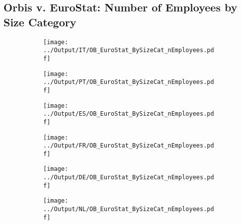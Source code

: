 \documentclass[12pt,notitlepage]{article}
\begin{document}
\subsection{Orbis v. EuroStat: Number of Employees by Size Category}
\begin{figure}[!htpb]
\centering
\begin{subfigure}{.49\textwidth}
    \centering
 \texttt{[image: ../Output/IT/OB\_EuroStat\_BySizeCat\_nEmployees.pdf]}
\end{subfigure}%
\begin{subfigure}{.49\textwidth}
    \centering
 \texttt{[image: ../Output/PT/OB\_EuroStat\_BySizeCat\_nEmployees.pdf]}
\end{subfigure}
\begin{subfigure}{.49\textwidth}
    \centering
 \texttt{[image: ../Output/ES/OB\_EuroStat\_BySizeCat\_nEmployees.pdf]}
\end{subfigure}%
\begin{subfigure}{.49\textwidth}
    \centering
 \texttt{[image: ../Output/FR/OB\_EuroStat\_BySizeCat\_nEmployees.pdf]}
\end{subfigure}
\begin{subfigure}{.49\textwidth}
    \centering
 \texttt{[image: ../Output/DE/OB\_EuroStat\_BySizeCat\_nEmployees.pdf]}
\end{subfigure}
\begin{subfigure}{.49\textwidth}
    \centering
 \texttt{[image: ../Output/NL/OB\_EuroStat\_BySizeCat\_nEmployees.pdf]}
\end{subfigure}
\end{figure}
\clearpage
\end{document}
